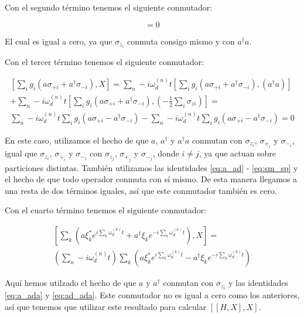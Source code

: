 Con el segundo término tenemos el siguiente conmutador:

\begin{equation}
    [- \frac{1}{2} \sum\limits_i \omega_{qi} \sigma_{zi} , X] = 0
\end{equation}

El cual es igual a cero, ya que $\sigma_{z_i}$ conmuta consigo mismo y con $a^\dagger a$.

Con el tercer término tenemos el siguiente conmutador:

\begin{multline}
\left[\sum\limits_i g_i (a \sigma_{+ i} + a^\dagger \sigma_{- i}), X\right] = 
\sum\limits_n-i \omega_d^{(n)} t \left[\sum\limits_i g_i (a \sigma_{+ i} + a^\dagger \sigma_{- i}), (a^\dagger a)\right] \\
+ \sum\limits_n-i \omega_d^{(n)} t \left[\sum\limits_i g_i (a \sigma_{+ i} + a^\dagger \sigma_{- i}), (- \frac{1}{2} \sum\limits_i \sigma_{z i})\right] = \\
\sum\limits_n-i \omega_d^{(n)} t \sum\limits_i g_i (a \sigma_{+ i} - a^\dagger \sigma_{- i})
- \sum\limits_n-i \omega_d^{(n)} t \sum\limits_i g_i (a \sigma_{+ i} - a^\dagger \sigma_{- i}) = 0
\end{multline}

En este caso, utilizamos el hecho de que $a$, $a^\dagger$ y $a^\dagger a$ conmutan con $\sigma_{z_i}$, $\sigma_{+_i}$ y $\sigma_{-_i}$, igual que $\sigma_{z_i}$, $\sigma_{+_i}$ y $\sigma_{-_i}$ con $\sigma_{z_j}$, $\sigma_{+_j}$ y $\sigma_{-_j}$, donde $i \neq j$, ya que actuan sobre particiones distintas. También utilizamos las identidades \ref{eq:a_ad} - \ref{eq:sm_sp} y el hecho de que todo operador conmuta con sí mismo. De esta manera llegamos a una resta de dos términos iguales, así que este conmutador también es cero.

Con el cuarto término tenemos el siguiente conmutador:

\begin{multline}
    \left[\sum\limits_k \left(a\xi_k^*e^{i\sum\limits_k \omega_d^{(k)}t}+ a^\dagger\xi_ke^{-i\sum\limits_k \omega_d^{(k)}t}\right), X\right] = \\
    \left(\sum\limits_n-i \omega_d^{(n)} t\right) \sum\limits_k \left(a\xi_k^*e^{i\sum\limits_k \omega_d^{(k)}t} - a^\dagger\xi_ke^{-i\sum\limits_k \omega_d^{(k)}t}\right)
\end{multline}

Aquí hemos utilzado el hecho de que $a$ y $a^\dagger$ conmutan con $\sigma_{z_i}$ y las identidades \ref{eq:a_ada} y \ref{eq:ad_ada}. Este conmutador no es igual a cero como los anteriores, así que tenemos que utilizar este resultado para calcular $[[H,X],X]$.

